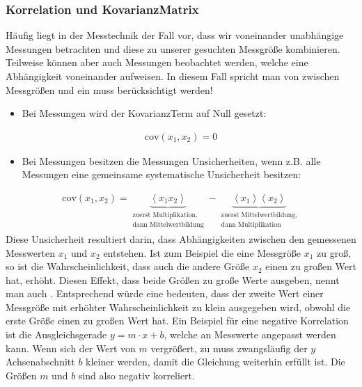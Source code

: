 \documentclass[letterpaper,10pt,english]{jupyterBook}
\begin{document}
\subsubsection{Korrelation und Kovarianz\sphinxhyphen{}Matrix }
\label{\detokenize{content/1_Fehlerfortpflanzung:korrelation-und-kovarianz-matrix-a-id-sec-korrelation-kovarianz-a}}
\sphinxAtStartPar
Häufig liegt in der Messtechnik der Fall vor, dass wir voneinander unabhängige Messungen betrachten und diese zu unserer gesuchten Messgröße kombinieren. Teilweise können aber auch Messungen beobachtet werden, welche eine Abhängigkeit voneinander aufweisen. In diesem Fall spricht man von  zwischen Messgrößen und ein  muss berücksichtigt werden!
\begin{itemize}
\item {} 
\sphinxAtStartPar
Bei  Messungen wird der Kovarianz\sphinxhyphen{}Term auf Null gesetzt:

\end{itemize}
\begin{equation*}
\begin{split}\mathrm{cov}(x_1, x_2) = 0\end{split}
\end{equation*}\begin{itemize}
\item {} 
\sphinxAtStartPar
Bei  Messungen besitzen die Messungen  Unsicherheiten, wenn z.B. alle Messungen eine gemeinsame systematische Unsicherheit besitzen:

\end{itemize}
\begin{equation*}
\begin{split}\mathrm{cov}(x_1, x_2) = \underbrace{\left< x_1 x_2 \right>}_{\substack{\text{zuerst Multiplikation,} \\ \text{dann Mittelwertbildung}}} - \underbrace{\left< x_1 \right>\left< x_2 \right>}_{\substack{\text{zuerst Mittelwertbildung,} \\ \text{dann Multiplikation}}}\end{split}
\end{equation*}
\sphinxAtStartPar
Diese  Unsicherheit resultiert darin, dass Abhängigkeiten zwischen den gemessenen Messwerten \(x_1\) und \(x_2\) entstehen. Ist zum Beispiel die eine Messgröße \(x_1\) zu groß, so ist die Wahrscheinlichkeit, dass auch die andere Größe \(x_2\) einen zu großen Wert hat, erhöht. Diesen Effekt, dass beide Größen zu große Werte ausgeben, nennt man auch . Entsprechend würde eine  bedeuten, dass der zweite Wert einer Messgröße mit erhöhter Wahrscheinlichkeit zu klein ausgegeben wird, obwohl die erste Größe einen zu großen Wert hat. Ein Beispiel für eine negative Korrelation ist die Ausgleichsgerade \(y = m\cdot x + b\), welche an Messwerte angepasst werden kann. Wenn sich der Wert von \(m\) vergrößert, zu muss zwangsläufig der \(y\)\sphinxhyphen{}Achsenabschnitt \(b\) kleiner werden, damit die Gleichung weiterhin erfüllt ist. Die Größen \(m\) und \(b\) sind also negativ korreliert.
\end{document}

